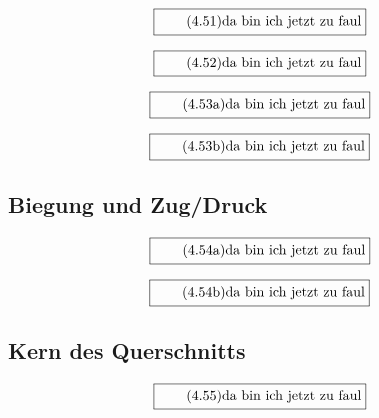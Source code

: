 \documentclass[11pt]{article}
\newcommand{\1}{ {\mathds{1}} }
\begin{document}
		\begin{equation}
			\boxed{
				\tag{4.51}
				\begin{split}
					\text{da bin ich jetzt zu faul}
				\end{split}
			}
		\end{equation}
		
		\begin{equation}
			\boxed{
				\tag{4.52}
				\begin{split}
					\text{da bin ich jetzt zu faul}
				\end{split}
			}
		\end{equation}

		\begin{equation}
			\boxed{
				\tag{4.53a}
				\begin{split}
					\text{da bin ich jetzt zu faul}
				\end{split}
			}
		\end{equation}

		\begin{equation}
			\boxed{
				\tag{4.53b}
				\begin{split}
					\text{da bin ich jetzt zu faul}
				\end{split}
			}
		\end{equation}

		\subsection{Biegung und Zug/Druck}

		\begin{equation}
			\boxed{
				\tag{4.54a}
				\begin{split}
					\text{da bin ich jetzt zu faul}
				\end{split}
			}
		\end{equation}
		
		\begin{equation}
			\boxed{
				\tag{4.54b}
				\begin{split}
					\text{da bin ich jetzt zu faul}
				\end{split}
			}
		\end{equation}
		
		\subsection{Kern des Querschnitts}

		\begin{equation}
			\boxed{
				\tag{4.55}
				\begin{split}
					\text{da bin ich jetzt zu faul}
				\end{split}
			}
		\end{equation}
		
\end{document}
